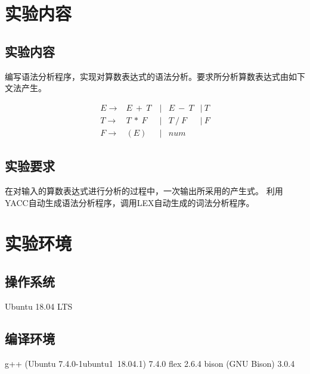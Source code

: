 \section{实验内容}
\subsection{实验内容}
编写语法分析程序，实现对算数表达式的语法分析。要求所分析算数表达式由如下文法产生。

\begin{center}
  \begin{equation*}
    \begin{array}{lcccc}
      E \rightarrow& E \ + \ T\ &|& E \ - \ T &|\ T \\
      T \rightarrow& T \ * \ F\ &|& T \ / \ F &|\ F \\
      F \rightarrow& (E)        &|& num &
    \end{array}
  \end{equation*}
\end{center}

\subsection{实验要求}
在对输入的算数表达式进行分析的过程中，一次输出所采用的产生式。
利用YACC自动生成语法分析程序，调用LEX自动生成的词法分析程序。

\section{实验环境}
\subsection{操作系统}
Ubuntu 18.04 LTS
\subsection{编译环境}
g++ (Ubuntu 7.4.0-1ubuntu1~18.04.1) 7.4.0
flex 2.6.4
bison (GNU Bison) 3.0.4